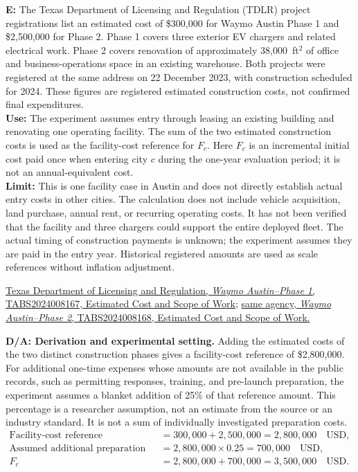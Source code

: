 \documentclass[10pt,a4paper]{article}
\begin{document}
\noindent
\textbf{E:}
The Texas Department of Licensing and Regulation (TDLR) project registrations list an estimated cost of \$300,000 for Waymo Austin Phase 1 and \$2,500,000 for Phase 2. Phase 1 covers three exterior EV chargers and related electrical work. Phase 2 covers renovation of approximately 38,000~ft$^2$ of office and business-operations space in an existing warehouse. Both projects were registered at the same address on 22 December 2023, with construction scheduled for 2024. These figures are registered estimated construction costs, not confirmed final expenditures. \\
\textbf{Use:}
The experiment assumes entry through leasing an existing building and renovating one operating facility. The sum of the two estimated construction costs is used as the facility-cost reference for $F_c$. Here $F_c$ is an incremental initial cost paid once when entering city $c$ during the one-year evaluation period; it is not an annual-equivalent cost. \\
\textbf{Limit:}
This is one facility case in Austin and does not directly establish actual entry costs in other cities. The calculation does not include vehicle acquisition, land purchase, annual rent, or recurring operating costs. It has not been verified that the facility and three chargers could support the entire deployed fleet. The actual timing of construction payments is unknown; the experiment assumes they are paid in the entry year. Historical registered amounts are used as scale references without inflation adjustment.

\medskip
\noindent
\par\href{https://www.tdlr.texas.gov/TABS/Search/Print/TABS2024008167}
{Texas Department of Licensing and Regulation, \textit{Waymo Austin--Phase 1}, TABS2024008167, Estimated Cost and Scope of Work};
\href{https://www.tdlr.texas.gov/TABS/Search/Print/TABS2024008168}
{same agency, \textit{Waymo Austin--Phase 2}, TABS2024008168, Estimated Cost and Scope of Work.}

\medskip
\noindent
\textbf{D/A: Derivation and experimental setting.}
Adding the estimated costs of the two distinct construction phases gives a facility-cost reference of \$2,800,000. For additional one-time expenses whose amounts are not available in the public records, such as permitting responses, training, and pre-launch preparation, the experiment assumes a blanket addition of 25\% of that reference amount. This percentage is a researcher assumption, not an estimate from the source or an industry standard. It is not a sum of individually investigated preparation costs.
\[
\begin{aligned}
\text{Facility-cost reference}
&=300{,}000+2{,}500{,}000
=2{,}800{,}000\quad\text{USD},\\
\text{Assumed additional preparation cost}
&=2{,}800{,}000\times0.25
=700{,}000\quad\text{USD},\\
F_c&=2{,}800{,}000+700{,}000
=3{,}500{,}000\quad\text{USD}.
\end{aligned}
\]
\end{document}
